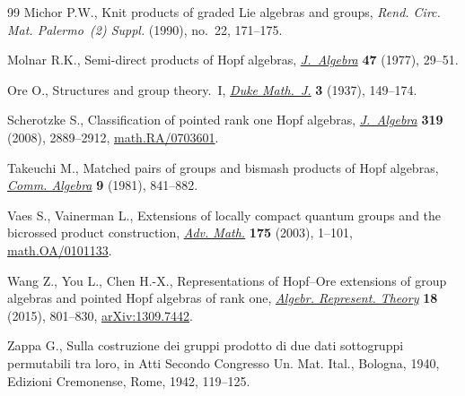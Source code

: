 \documentclass[pdftex]{sigma}
\numberwithin{equation}{section}
\begin{document}
\begin{thebibliography}{99}
Michor P.W., Knit products of graded {L}ie algebras and groups, \textit{Rend. Circ. Mat. Palermo~(2) Suppl.} (1990),
 no.~22, 171--175.

Molnar R.K., Semi-direct products of {H}opf algebras, \href{https://doi.org/10.1016/0021-8693(77)90208-3}{\textit{J.~Algebra}}
 \textbf{47} (1977), 29--51.

Ore O., Structures and group theory.~{I}, \href{https://doi.org/10.1215/S0012-7094-37-00311-9}{\textit{Duke Math.~J.}} \textbf{3}
 (1937), 149--174.

Scherotzke S., Classification of pointed rank one {H}opf algebras,
 \href{https://doi.org/10.1016/j.jalgebra.2008.01.028}{\textit{J.~Algebra}} \textbf{319} (2008), 2889--2912,
 \href{https://arxiv.org/abs/math.RA/0703601}{math.RA/0703601}.

Takeuchi M., Matched pairs of groups and bismash products of {H}opf algebras,
 \href{https://doi.org/10.1080/00927878108822621}{\textit{Comm. Algebra}} \textbf{9} (1981), 841--882.

Vaes S., Vainerman L., Extensions of locally compact quantum groups and the
 bicrossed product construction, \href{https://doi.org/10.1016/S0001-8708(02)00040-3}{\textit{Adv. Math.}} \textbf{175} (2003),
 1--101, \href{https://arxiv.org/abs/math.OA/0101133}{math.OA/0101133}.

Wang Z., You L., Chen H.-X., Representations of {H}opf--{O}re extensions of
 group algebras and pointed {H}opf algebras of rank one, \href{https://doi.org/10.1007/s10468-015-9517-z}{\textit{Algebr.
 Represent. Theory}} \textbf{18} (2015), 801--830, \href{https://arxiv.org/abs/1309.7442}{arXiv:1309.7442}.

Zappa G., Sulla costruzione dei gruppi prodotto di due dati sottogruppi
 permutabili tra loro, in Atti {S}econdo {C}ongresso {U}n. {M}at. {I}tal.,
 {B}ologna, 1940, Edizioni Cremonense, Rome, 1942, 119--125.

\end{thebibliography}\LastPageEnding
\end{document}
